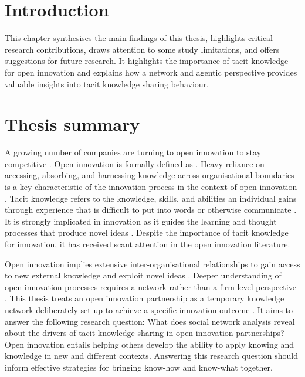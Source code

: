 
\section{Introduction}

This chapter synthesises the main findings of this thesis, highlights critical research contributions, draws attention to  some study limitations, and offers suggestions for future research. It highlights the importance of tacit knowledge for open innovation and explains how a network and agentic perspective provides valuable insights into tacit knowledge sharing behaviour.  

\section{Thesis summary}

A growing number of companies are turning to open innovation to stay competitive \citep{stanko2017under}. Open innovation is formally defined as  \citep[][pg.~17]{chesbrough2014explicating}. Heavy reliance on accessing, absorbing, and harnessing knowledge across organisational boundaries is a key characteristic of the innovation process in the context of open innovation \citep{chesbrough2012open}. Tacit knowledge refers to the knowledge, skills, and abilities an individual gains through experience that is difficult to put into words or otherwise communicate \citep{kreutz2014catalyzing}. It is strongly implicated in innovation as it guides the learning and thought processes that produce novel ideas \citep{leonard1998role,lam2000tacit}. Despite the importance of tacit knowledge for innovation, it has received scant attention in the open innovation literature. \medskip

Open innovation implies extensive inter-organisational relationships to gain access to new external knowledge and exploit novel ideas \citep{chiaroni2011open}. Deeper understanding of open innovation processes requires a network rather than a firm-level perspective \citep{fichter2009innovation,martinez2014analysis,yun2016network}. This thesis treats an open innovation partnership as a temporary knowledge network deliberately set up to achieve a specific innovation outcome \citep{turner2003natureoftheproject,perez2013temporary,terhorst2018tacit}. It aims to answer the following research question: What does social network analysis reveal about the drivers of tacit knowledge sharing in open innovation partnerships? Open innovation entails helping others develop the ability to apply knowing and knowledge in new and different contexts. Answering this research question should inform effective strategies for bringing know-how and know-what together. \medskip

